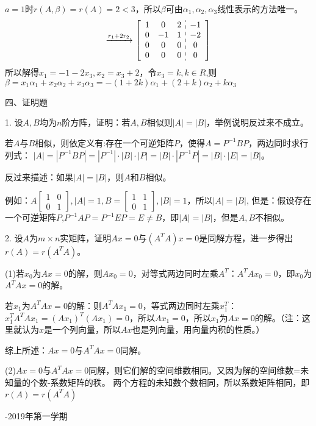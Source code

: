 \documentclass{article}
\begin{document}
\begin{jie}
$a=1$时$r(A,\beta)=r(A)=2<3$，所以$\beta$可由$\alpha_{1},\alpha_{2},\alpha_{3}$线性表示的方法唯一。
\begin{equation*}
\xrightarrow{r_1+2r_{2}}
{
\left[
\begin{array}{c:c}
\begin{matrix}
1 & 0 & 2 \\
  0 & -1 & 1 \\
   0& 0&0\\
 0 & 0 & 0
\end{matrix}&
\begin{matrix}
-1  \\
-2\\
0\\
0
\end{matrix}
\end{array}
\right]}
\end{equation*}
所以解得$x_{1}=-1-2x_{3},x_{2}=x_{3}+2$，令$x_{3}=k,k\in R$,则$\beta=x_ {1}\alpha_{1}+x_{2}\alpha_{2}+x_{3}\alpha_{3}=-(1+2k)\alpha_{1}+(2+k)\alpha_{2}+k\alpha_{3}$
\end{jie}

四、证明题

1. 设$A,B$均为$n$阶方阵，证明：若$A,B$相似则$|A|=|B|$，举例说明反过来不成立。

\begin{zhengming}
若$A$与$B$相似，则依定义有:存在一个可逆矩阵$P$，使得$A=P^{-1}BP$，两边同时求行列式：
$|A|=|P^ {-1}BP|=|P^{-1}|\cdot|B|\cdot|P|=|B|\cdot|P^{-1}P|=|B|\cdot|E|=|B|$。

反过来描述：如果$|A|=|B|$，则$A$和$B$相似。

例如：$A
\begin{bmatrix}
  1 & 0\\
  0& 1
\end{bmatrix},|A|=1
,B=
\begin{bmatrix}
  1 & 1 \\
  0 & 1
\end{bmatrix},|B|=1
$，所以$|A|=|B|$,
但是：假设存在一个可逆矩阵$P$,$P^{-1}AP=P^{-1}EP=E\neq B$，即$|A|=|B|$，但是$A,B$不相似。
\end{zhengming}

2. 设$A$为$m\times n$实矩阵，证明$Ax=0$与$(A^{T}A)x=0$是同解方程，进一步得出$r(A)=r(A^{T}A)$。

\begin{jie}
(1)若$x_0$为$Ax=0$的解，则$Ax_0=0$，对等式两边同时左乘$A^T$：$A^TAx_0=0$，即$x_0$为$A^TAx=0$的解。

若$x_1$为$A^TAx=0$的解：则$A^TAx_1=0$，等式两边同时左乘$x_1^T$：$x_1^TA^TAx_1=(Ax_1)^T(Ax_1)=0$，所以$Ax_1=0$，所以$x_1$为$Ax=0$的解。（注：这里就认为$x$是一个列向量，所以$Ax$也是列向量，用\textcolor[rgb]{1.00,0.00,0.00}{向量内积}的性质。）

综上所述：$Ax=0$与$A^TAx=0$同解。

(2)$Ax=0$与$A^TAx=0$同解，则它们解的空间维数相同。又因为解的空间维数=未知量的个数-系数矩阵的秩。
两个方程的未知数个数相同，所以系数矩阵相同，即$r(A)=r(A^TA)$
\end{jie}
\newpage
\hphantom{~~}\hfill {-2019年第一学期} \hfill\hphantom{~~}
\end{document}
